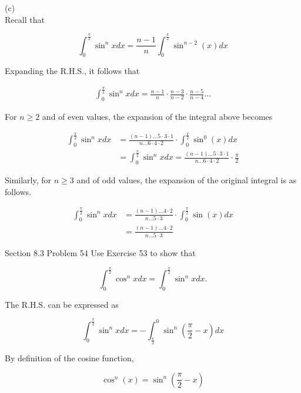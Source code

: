 \documentclass{article}
\begin{document}
    (c) \\
    Recall that

    \[
        \int_0^{\frac{\pi}{2}}\sin^n{x}dx = \frac{n-1}{n} \int_0^{\frac{\pi}{2}} \sin^{n-2}{(x)}dx
    \]

    Expanding the R.H.S., it follows that

    \begin{align*}
        \int_0^{\frac{\pi}{2}}\sin^n{x}dx = \frac{n-1}{n}\cdot\frac{n-3}{n-2}\cdot\frac{n-5}{n-4}\dots
    \end{align*}

    For $n\geq 2$ and of even values, the expansion of the integral above becomes

    \begin{align*}
        \int_0^{\frac{\pi}{2}}\sin^n{x}dx &= \frac{(n-1)\dots 5 \cdot 3 \cdot 1 }{n\dots 6 \cdot 4 \cdot 2}\cdot \int_0^{\frac{\pi}{2}} \sin^{0}{(x)}dx \\
                                          &= \int_0^{\frac{\pi}{2}}\sin^n{x}dx = \frac{(n-1)\dots5\cdot3\cdot1}{n\dots6\cdot4\cdot2}\cdot\frac{\pi}{2}
    \end{align*}

    Similarly, for $n\geq 3$ and of odd values, the expansion of the original integral is as follows.

    \begin{align*}
        \int_0^{\frac{\pi}{2}}\sin^n{x}dx   &= \frac{(n-1)\dots 4\cdot 2}{n\dots 5\cdot 3}\cdot\int_0^{\frac{\pi}{2}} \sin{(x)}dx \\
                                            &= \frac{(n-1)\dots4\cdot 2}{n\dots 5\cdot 3}
    \end{align*}

    \begin{tbhtheorem}{Section 8.3 Problem 54}
        Use Exercise 53 to show that

        \[
            \int_0^{\frac{\pi}{2}} \cos^n{x}dx = \int_0^{\frac{\pi}{2}}\sin^n{x}dx.
        \]
    \end{tbhtheorem}

    The R.H.S. can be expressed as

    \[
        \int_0^{\frac{\pi}{2}}\sin^n{x}dx = -\int^0_{\frac{\pi}{2}}\sin^n{\left(\frac{\pi}{2}-x\right)}dx
    \]

    By definition of the cosine function,

    \[
        \cos^n{(x)} = \sin^n{\left(\frac{\pi}{2}-x\right)}
    \]
\end{document}

